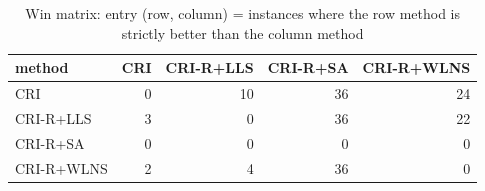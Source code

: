 \begin{table}[htbp]
\centering
\small
\caption{Win matrix: entry (row, column) = instances where the row method is strictly better than the column method}
\label{tab:E5b_ablation_60s_b60_wins}
\begin{tabular}{lrrrr}
\toprule
method & CRI & CRI-R+LLS & CRI-R+SA & CRI-R+WLNS \\
\midrule
CRI & 0 & 10 & 36 & 24 \\
CRI-R+LLS & 3 & 0 & 36 & 22 \\
CRI-R+SA & 0 & 0 & 0 & 0 \\
CRI-R+WLNS & 2 & 4 & 36 & 0 \\
\bottomrule
\end{tabular}
\end{table}
